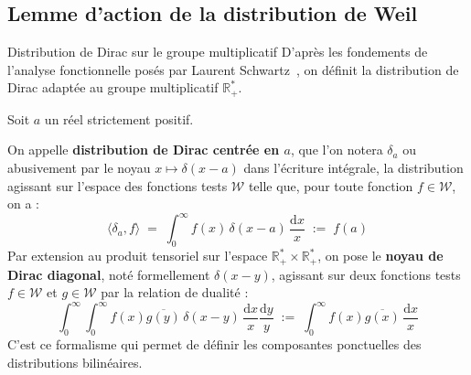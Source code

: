 \documentclass[Riemann_Hypothesis.tex]{subfiles}
\begin{document}
\color{red}
\subsection{Lemme d'action de la distribution de Weil}
\color{black}

\begin{DefNef}[label=df:DistributionDiracMultiplicative_fr]{Distribution de Dirac sur le groupe multiplicatif}
    D'après les fondements de l'analyse fonctionnelle posés par Laurent 
    Schwartz~\cite{schwartz1966_distributions}, on définit la distribution de Dirac adaptée au groupe multiplicatif $\mathbb{R}_+^*$. \par
    Soit $a$ un réel strictement positif. \par
    On appelle \textbf{distribution de Dirac centrée en $a$}, que l'on notera $\delta_a$ ou abusivement par le noyau $x \mapsto \delta(x-a)$ dans l'écriture intégrale, la distribution agissant sur l'espace des fonctions tests $\mathcal{W}$ telle que, pour toute fonction $f \in \mathcal{W}$, on a :
    \begin{equation*}
        \langle \delta_a, f \rangle \;=\; \int_{0}^{\infty} f(x) \, \delta(x-a) \, \frac{\mathrm{d}x}{x} \;:=\; f(a)
    \end{equation*}
    Par extension au produit tensoriel sur l'espace $\mathbb{R}_+^* \times \mathbb{R}_+^*$, on pose le \textbf{noyau de Dirac diagonal}, noté formellement $\delta(x-y)$, agissant sur deux fonctions tests $f \in \mathcal{W}$ et $g \in \mathcal{W}$ par la relation de dualité :
    \begin{equation*}
        \int_{0}^{\infty} \int_{0}^{\infty} f(x) \overline{g(y)} \, \delta(x-y) \, \frac{\mathrm{d}x}{x} \frac{\mathrm{d}y}{y} \;:=\; \int_{0}^{\infty} f(x) \overline{g(x)} \, \frac{\mathrm{d}x}{x}
    \end{equation*}
    C'est ce formalisme qui permet de définir les composantes
    ponctuelles des distributions bilinéaires.
\end{DefNef}
\end{document}
